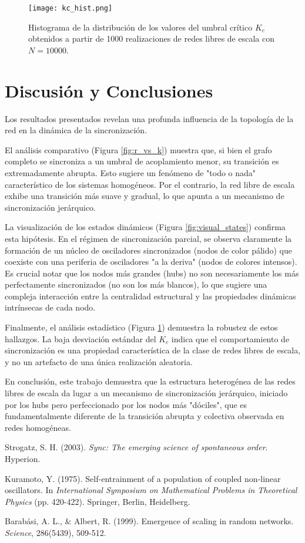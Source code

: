 \documentclass[12pt, a4paper]{article}
\begin{document}
\begin{figure}[h!]
    \centering
    \texttt{[image: kc\_hist.png]}
    \caption{Histograma de la distribución de los valores del umbral crítico \(K_c\) obtenidos a partir de 1000 realizaciones de redes libres de escala con \(N=10000\).}
    \label{fig:kc_hist}
\end{figure}

\section{Discusión y Conclusiones}

Los resultados presentados revelan una profunda influencia de la topología de la red en la dinámica de la sincronización.

El análisis comparativo (Figura \ref{fig:r_vs_k}) muestra que, si bien el grafo completo se sincroniza a un umbral de acoplamiento menor, su transición es extremadamente abrupta. Esto sugiere un fenómeno de "todo o nada" característico de los sistemas homogéneos. Por el contrario, la red libre de escala exhibe una transición más suave y gradual, lo que apunta a un mecanismo de sincronización jerárquico.

La visualización de los estados dinámicos (Figura \ref{fig:visual_states}) confirma esta hipótesis. En el régimen de sincronización parcial, se observa claramente la formación de un núcleo de osciladores sincronizados (nodos de color pálido) que coexiste con una periferia de osciladores "a la deriva" (nodos de colores intensos). Es crucial notar que los nodos más grandes (hubs) no son necesariamente los más perfectamente sincronizados (no son los más blancos), lo que sugiere una compleja interacción entre la centralidad estructural y las propiedades dinámicas intrínsecas de cada nodo.

Finalmente, el análisis estadístico (Figura \ref{fig:kc_hist}) demuestra la robustez de estos hallazgos. La baja desviación estándar del \(K_c\) indica que el comportamiento de sincronización es una propiedad característica de la clase de redes libres de escala, y no un artefacto de una única realización aleatoria.

En conclusión, este trabajo demuestra que la estructura heterogénea de las redes libres de escala da lugar a un mecanismo de sincronización jerárquico, iniciado por los hubs pero perfeccionado por los nodos más "dóciles", que es fundamentalmente diferente de la transición abrupta y colectiva observada en redes homogéneas.

\begin{thebibliography}{9}
Strogatz, S. H. (2003). \textit{Sync: The emerging science of spontaneous order}. Hyperion.

Kuramoto, Y. (1975). Self-entrainment of a population of coupled non-linear oscillators. In \textit{International Symposium on Mathematical Problems in Theoretical Physics} (pp. 420-422). Springer, Berlin, Heidelberg.

Barabási, A. L., \& Albert, R. (1999). Emergence of scaling in random networks. \textit{Science}, 286(5439), 509-512.
\end{thebibliography}
\end{document}
